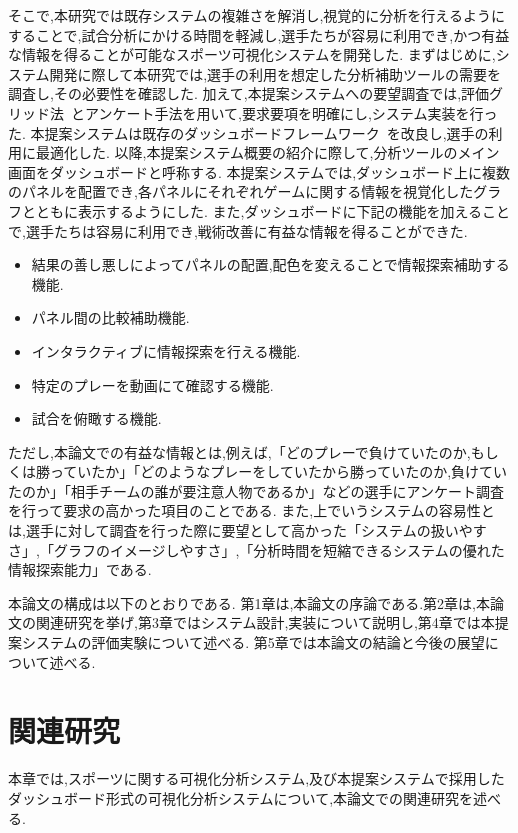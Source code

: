 \documentclass[sotsuron]{kuee}
\begin{document}
	そこで,本研究では既存システムの複雑さを解消し,視覚的に分析を行えるようにすることで,試合分析にかける時間を軽減し,選手たちが容易に利用でき,かつ有益な情報を得ることが可能なスポーツ可視化システムを開発した.
	まずはじめに,システム開発に際して本研究では,選手の利用を想定した分析補助ツールの需要を調査し,その必要性を確認した.
	加えて,本提案システムへの要望調査では,評価グリッド法~\cite{EGM}とアンケート手法を用いて,要求要項を明確にし,システム実装を行った.
	本提案システムは既存のダッシュボードフレームワーク~\cite{dashboard}を改良し,選手の利用に最適化した.
	以降,本提案システム概要の紹介に際して,分析ツールのメイン画面をダッシュボードと呼称する.
	本提案システムでは,ダッシュボード上に複数のパネルを配置でき,各パネルにそれぞれゲームに関する情報を視覚化したグラフとともに表示するようにした.
	また,ダッシュボードに下記の機能を加えることで,選手たちは容易に利用でき,戦術改善に有益な情報を得ることができた.
		\begin{itemize}
			\item 結果の善し悪しによってパネルの配置,配色を変えることで情報探索補助する機能.
			\item パネル間の比較補助機能.
			\item インタラクティブに情報探索を行える機能.
			\item 特定のプレーを動画にて確認する機能.
			\item 試合を俯瞰する機能.
		\end{itemize}
	ただし,本論文での有益な情報とは,例えば,「どのプレーで負けていたのか,もしくは勝っていたか」「どのようなプレーをしていたから勝っていたのか,負けていたのか」「相手チームの誰が要注意人物であるか」などの選手にアンケート調査を行って要求の高かった項目のことである.
	また,上でいうシステムの容易性とは,選手に対して調査を行った際に要望として高かった「システムの扱いやすさ」,「グラフのイメージしやすさ」,「分析時間を短縮できるシステムの優れた情報探索能力」である.
	
	本論文の構成は以下のとおりである.
	第1章は,本論文の序論である.第2章は,本論文の関連研究を挙げ,第3章ではシステム設計,実装について説明し,第4章では本提案システムの評価実験について述べる.
	第5章では本論文の結論と今後の展望について述べる.

\chapter{関連研究}
	本章では,スポーツに関する可視化分析システム,及び本提案システムで採用したダッシュボード形式の可視化分析システムについて,本論文での関連研究を述べる.
	
\end{document}

